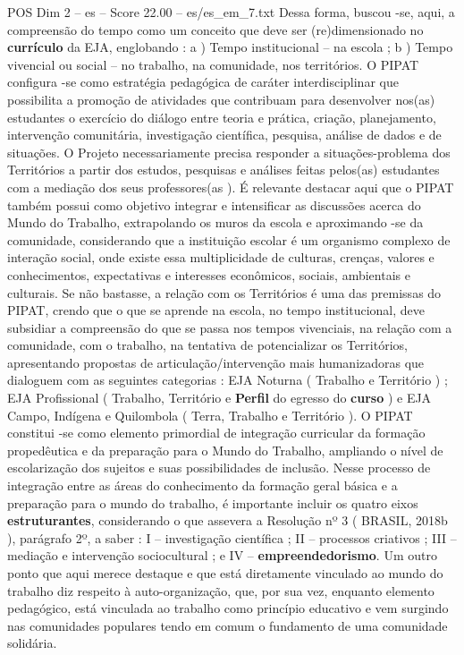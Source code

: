 \begin{textsample}{POS Dim 2 – es – Score 22.00 – es/es\_em\_7.txt}
Dessa forma, buscou -se, aqui, a compreensão do tempo como um conceito que deve ser (re)dimensionado no \textbf{currículo} da EJA, englobando : a ) Tempo institucional – na escola ; b ) Tempo vivencial ou social – no trabalho, na comunidade, nos territórios.
O PIPAT configura -se como estratégia pedagógica de caráter interdisciplinar que possibilita a promoção de atividades que contribuam para desenvolver nos(as) estudantes o exercício do diálogo entre teoria e prática, criação, planejamento, intervenção comunitária, investigação científica, pesquisa, análise de dados e de situações.
O Projeto necessariamente precisa responder a situações-problema dos Territórios a partir dos estudos, pesquisas e análises feitas pelos(as) estudantes com a mediação dos seus professores(as ).
É relevante destacar aqui que o PIPAT também possui como objetivo integrar e intensificar as discussões acerca do Mundo do Trabalho, extrapolando os muros da escola e aproximando -se da comunidade, considerando que a instituição escolar é um organismo complexo de interação social, onde existe essa multiplicidade de culturas, crenças, valores e conhecimentos, expectativas e interesses econômicos, sociais, ambientais e culturais.
Se não bastasse, a relação com os Territórios é uma das premissas do PIPAT, crendo que o que se aprende na escola, no tempo institucional, deve subsidiar a compreensão do que se passa nos tempos vivenciais, na relação com a comunidade, com o trabalho, na tentativa de potencializar os Territórios, apresentando propostas de articulação/intervenção mais humanizadoras que dialoguem com as seguintes categorias : EJA Noturna ( Trabalho e Território ) ; EJA Profissional ( Trabalho, Território e \textbf{Perfil} do egresso do \textbf{curso} ) e EJA Campo, Indígena e Quilombola ( Terra, Trabalho e Território ).
O PIPAT constitui -se como elemento primordial de integração curricular da formação propedêutica e da preparação para o Mundo do Trabalho, ampliando o nível de escolarização dos sujeitos e suas possibilidades de inclusão.
Nesse processo de integração entre as áreas do conhecimento da formação geral básica e a preparação para o mundo do trabalho, é importante incluir os quatro eixos \textbf{estruturantes}, considerando o que assevera a Resolução nº 3 ( BRASIL, 2018b ), parágrafo 2º, a saber : I – investigação científica ; II – processos criativos ; III – mediação e intervenção sociocultural ; e IV – \textbf{empreendedorismo}.
Um outro ponto que aqui merece destaque e que está diretamente vinculado ao mundo do trabalho diz respeito à auto-organização, que, por sua vez, enquanto elemento pedagógico, está vinculada ao trabalho como princípio educativo e vem surgindo nas comunidades populares tendo em comum o fundamento de uma comunidade solidária.

\end{textsample}
